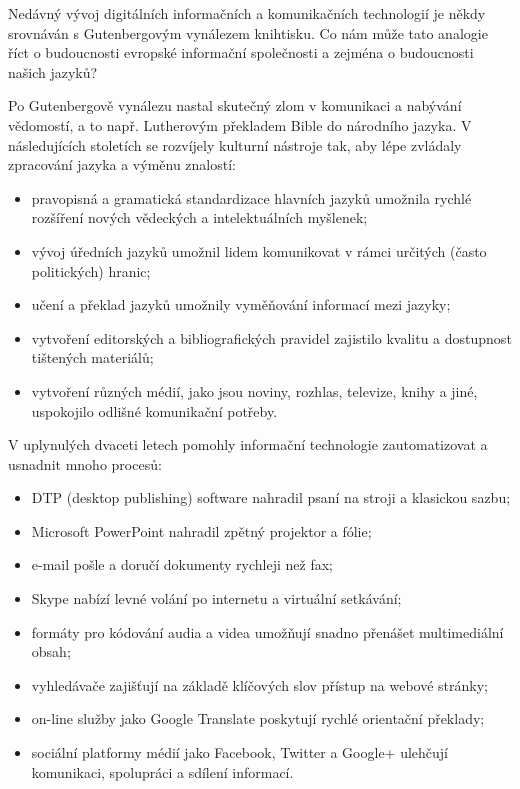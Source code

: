 \begin{multicols}{2}
Nedávný vývoj digitálních informačních a komunikačních technologií je někdy srovnáván s Gutenbergovým vynálezem knihtisku. Co nám může tato analogie říct o budoucnosti evropské informační společnosti a zejména o budoucnosti našich jazyků?


Po Gutenbergově vynálezu nastal skutečný zlom v komunikaci a nabývání vědomostí, a to např. Lutherovým překladem Bible do národního jazyka.  V následujících stoletích se rozvíjely kulturní nástroje tak, aby lépe zvládaly zpracování jazyka a výměnu znalostí:

\begin{itemize}
\item pravopisná a gramatická standardizace hlavních jazyků umožnila rychlé rozšíření nových vědeckých a intelektuálních myšlenek;
\item vývoj úředních jazyků umožnil lidem komunikovat v rámci určitých (často politických) hranic;
\item učení a překlad jazyků umožnily vyměňování informací mezi jazyky;
\item vytvoření editorských a bibliografických pravidel zajistilo kvalitu a dostupnost tištených materiálů;
\item vytvoření různých médií, jako jsou noviny, rozhlas, televize, knihy a jiné, uspokojilo odlišné komunikační potřeby.
\end{itemize}
    
V uplynulých dvaceti letech pomohly informační technologie zautomatizovat a usnadnit mnoho procesů:

\begin{itemize}
\item DTP (desktop publishing) software nahradil psaní na stroji a klasickou sazbu;
\item Microsoft PowerPoint nahradil zpětný projektor a fólie;
\item e-mail pošle a doručí dokumenty rychleji než fax;
\item Skype nabízí levné volání po internetu a virtuální setkávání;
\item formáty pro kódování audia a videa umožňují snadno přenášet multimediální obsah;
\item vyhledávače zajišťují na základě klíčových slov přístup na webové stránky;
\item on-line služby jako Google Translate poskytují rychlé orientační překlady;
\item sociální platformy médií jako Facebook, Twitter a Google+ ulehčují komunikaci, spolupráci a sdílení informací.
\end{itemize}


\end{multicols}
